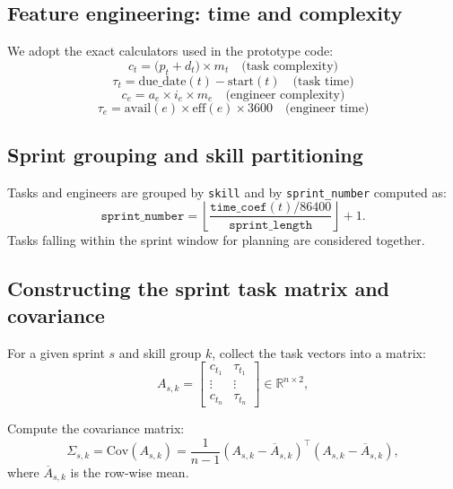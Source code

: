 \documentclass[journal]{IEEEtran}
\begin{document}
\subsection{Feature engineering: time and complexity}
We adopt the exact calculators used in the prototype code:
\begin{equation}
c_t = \big(p_t + d_t \big) \times m_t  \quad \text{(task complexity)} \label{eq:task_complexity}
\end{equation}
\begin{equation}
\tau_t = \mathrm{due\_date}(t) - \mathrm{start}(t) \quad \text{(task time)} \label{eq:task_time}
\end{equation}
\begin{equation}
c_e = a_e \times i_e \times m_e  \quad \text{(engineer complexity)} \label{eq:eng_complexity}
\end{equation}
\begin{equation}
\tau_e = \mathrm{avail}(e) \times \mathrm{eff}(e) \times 3600 \quad \text{(engineer time)} \label{eq:eng_time}
\end{equation}

\subsection{Sprint grouping and skill partitioning}
Tasks and engineers are grouped by \texttt{skill} and by \texttt{sprint\_number} computed as:
\[
\texttt{sprint\_number} = \left\lfloor \frac{\texttt{time\_coef}(t) / 86400}{\texttt{sprint\_length}} \right\rfloor + 1.
\]
Tasks falling within the sprint window for planning are considered together.

\subsection{Constructing the sprint task matrix and covariance}
For a given sprint $s$ and skill group $k$, collect the task vectors into a matrix:
\[
A_{s,k} =
\begin{bmatrix}
c_{t_1} & \tau_{t_1} \\
\vdots & \vdots \\
c_{t_n} & \tau_{t_n}
\end{bmatrix}
\in \mathbb{R}^{n \times 2},
\]

Compute the covariance matrix:
\begin{equation}
\label{eq:cov}
\Sigma_{s,k} = \mathrm{Cov}(A_{s,k}) = \frac{1}{n-1} (A_{s,k} - \overline{A}_{s,k})^\top (A_{s,k} - \overline{A}_{s,k}),
\end{equation}
where $\overline{A}_{s,k}$ is the row-wise mean.
\end{document}
